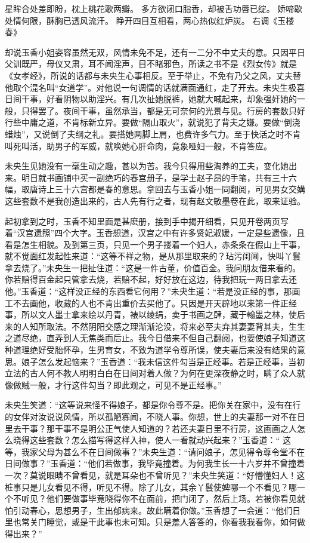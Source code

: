 \documentclass[a4paper,12pt,UTF8,twoside]{ctexbook}
\begin{document}
星眸合处差即盼，枕上桃花歌两瓣。
多方欲闭口脂香，却被舌功唇已绽。
娇啼歇处情何限，酥胸已透风流汗。
睁开四目互相看，两心热似红炉炭。
右调《玉楼春》

却说玉香小姐姿容虽然无双，风情未免不足，还有一二分不中丈夫的意。只因平日父训既严，母仪又肃，耳不闻淫声，目不睹邪色，所读之书不是《烈女传》就是《女孝经》，所说的话都与未央生心事相反。至于举止，不免有乃父之风，丈夫替他取个混名叫“女道学”。对他说一句调情的话就满面通红，走了开去。未央生极喜日间干事，好看阴物以助淫兴。有几次扯她脱裤，她就大喊起来，却象强奸她的一般，只得罢了。夜间干事，虽然承当，都是无可奈何的光景与见。行房的套数只好行些中庸之道，不肯标新立异。要做“隔山取火”，就说犯了背夫之嫌。要做“倒浇蜡烛”，又说倒了夫纲之礼。要搭她两脚上肩，也费许多气力。至于快活之时不肯叫死叫活，助男子的军威，就唤她心肝命肉，竟象哑妇一般，不肯答应。

未央生见她没有一毫生动之趣，甚以为苦。我今只得用些淘养的工夫，变化她出来。明日就书画铺中买一副绝巧的春宫册子，是学士赵子昂的手笔，共有三十六幅，取唐诗上三十六宫都是春的意思。拿回去与玉香小姐一同翻阅，可见男女交媾这些套数不是我创造出来的，古人先有行之者，现有赵文敏墨卷在此，取来证验。

起初拿到之时，玉香不知里面是甚麽册，接到手中揭开细看，只见开卷两页写着“汉宫遗照”四个大字。玉香想道，汉宫之中有许多贤妃淑媛，一定是些遗像，且看是怎生相貌。及到第三页，只见一个男子搂着一个妇人，赤条条在假山上干事，就不觉面红发起性来道：“这等不祥之物，是从那里取来的？玷污闺阃，快叫丫鬟拿去烧了。”未央生一把扯住道：“这是一件古董，价值百金。我问朋友借来看的。你若赔得百金起只管拿去烧，若赔不起，好好放在这边，待我把玩一两日拿去还他。”玉香道：“这样没正经的东西看它何用？”未央生道：“若是没正经的事，那画工不去画他，收藏的人也不肯出重价去买他了。只因是开天辟地以来第一件正经事，所以文人墨士拿来绘以丹青，裱以绫绢，卖于书画之肆，藏于翰墨之林，使后来的人知所取法。不然阴阳交感之理渐渐沦没，将来必至夫弃其妻妻背其夫，生生之道尽绝，直弄到人无焦类而后止。我今日借来不但自己翻阅，也要使娘子知道这种道理绝好受胎怀孕，生男育女，不致为道学令尊所误，使夫妻后来没有结果的意思。娘子怎么发起恼来？”玉香道：“我未信这件勾当是正经事。若是正经事，当初立法的古人何不教人明明白白在日间对着人做？为何在更深夜静之时，瞒了众人就像做贼一般，才行这件勾当？即此观之，可见不是正经事。”

未央生笑道：“这等说来怪不得娘子，都是你令尊不是。把你关在家中，没有在行的女伴对汝说说风情，所以孤陋寡闻，不晓人事。你想，世上的夫妻那一对不在日里去干事？那干事不是明公正气使人知道的？若还夫妻日里不行房，这画画之人怎么晓得这些套数？怎么描写得这样入神，使人一看就动兴起来？”玉香道：“ 这等，我家父母为甚么不在日间做事？”未央生道：“请问娘子，怎见得令尊令堂不在日间做事？”玉香道：“他们若做事，我毕竟撞着。为何我生长一十六岁并不曾撞着一次？莫说眼睛不曾看见，就是耳朵也不曾听见？”未央生笑道：“好懵懂妇人！这桩事只是儿女看见不得，听见不得。除了儿女，其余丫鬟使婢哪一个不看见？哪一个不听见？他们要做事毕竟晓得你不在面前，把门闭了，然后上场。若被你看见就怕引动春心，思想男子，生出郁病来。故此瞒着你做。”玉香想了一会道：“他们日里也常关门睡觉，或是干此事也未可知。只是羞人答答的，你看我我看你，如何做得出来？”
\end{document}
